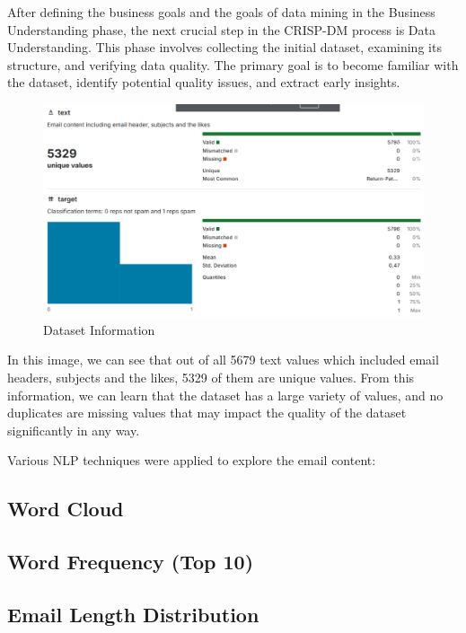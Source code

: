 After defining the business goals and the goals of data mining in the Business Understanding phase, the next crucial step in the CRISP-DM process is Data Understanding.
This phase involves collecting the initial dataset, examining its structure, and verifying data quality.
The primary goal is to become familiar with the dataset, identify potential quality issues, and extract early insights.

\begin{figure}[H]
    \centering
    \includegraphics[width=\linewidth]{images/dataset_information}
    \caption{Dataset Information}
    \label{fig:dataset_information}
\end{figure}

In this image, we can see that out of all 5679 text values which included email headers, subjects and the likes, 5329 of them are unique values.
From this information, we can learn that the dataset has a large variety of values, and no duplicates are missing values that may impact the quality of the dataset significantly in any way.

Various NLP techniques were applied to explore the email content:

\subsection{Word Cloud}
\label{subsec:word-cloud}


\subsection{Word Frequency (Top 10)}
\label{subsec:word-frequency}


\subsection{Email Length Distribution}
\label{subsec:email-length-distribution}


